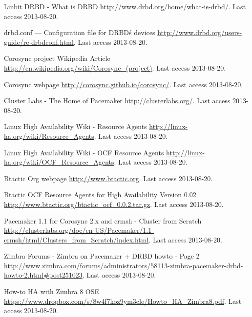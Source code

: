 \begin{thebibliography}{1}
 Linbit DRBD - What is DRBD
\url{http://www.drbd.org/home/what-is-drbd/}. Last access 2013-08-20.

 drbd.conf — Configuration file for DRBD\'s devices
\url{http://www.drbd.org/users-guide/re-drbdconf.html}. Last access 2013-08-20.


 Corosync project Wikipedia Article
\url{http://en.wikipedia.org/wiki/Corosync_(project)}. Last access 2013-08-20.

 Corosync webpage
\url{http://corosync.github.io/corosync/}. Last access 2013-08-20.

 Cluster Labs - The Home of Pacemaker
\url{http://clusterlabs.org/}. Last access 2013-08-20.


 Linux High Availability Wiki - Resource Agents
\url{http://linux-ha.org/wiki/Resource_Agents}. Last access 2013-08-20.

 Linux High Availability Wiki - OCF Resource Agents
\url{http://linux-ha.org/wiki/OCF_Resource_Agents}. Last access 2013-08-20.

 Btactic Org webpage
\url{http://www.btactic.org}. Last access 2013-08-20.

 Btactic OCF Resource Agents for High Availability Version 0.02
\url{http://www.btactic.org/btactic_ocf_0.0.2.tar.gz}. Last access 2013-08-20.


 Pacemaker 1.1 for Corosync 2.x and crmsh - Cluster from Scratch
\url{http://clusterlabs.org/doc/en-US/Pacemaker/1.1-crmsh/html/Clusters_from_Scratch/index.html}. Last access 2013-08-20.


 Zimbra Forums - Zimbra on Pacemaker + DRBD howto - Page 2
\url{http://www.zimbra.com/forums/administrators/58113-zimbra-pacemaker-drbd-howto-2.html#post251023}. Last access 2013-08-20.

 How-to HA with Zimbra 8 OSE
\url{https://www.dropbox.com/s/8w4f7koz9ym3cle/Howto_HA_Zimbra8.pdf}. Last access 2013-08-20.


\end{thebibliography}
